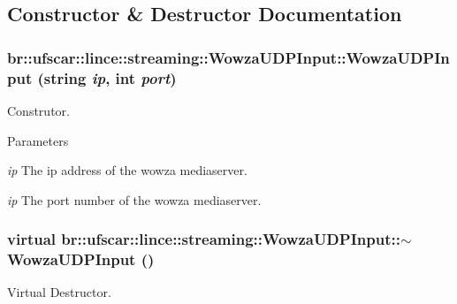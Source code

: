 \subsection{Constructor \& Destructor Documentation}
\hypertarget{classbr_1_1ufscar_1_1lince_1_1streaming_1_1WowzaUDPInput_a3cd953cb0be364b786b15745e69f6bd6}{
\subsubsection[{WowzaUDPInput}]{\setlength{\rightskip}{0pt plus 5cm}br::ufscar::lince::streaming::WowzaUDPInput::WowzaUDPInput (string {\em ip}, \/  int {\em port})}}
\label{classbr_1_1ufscar_1_1lince_1_1streaming_1_1WowzaUDPInput_a3cd953cb0be364b786b15745e69f6bd6}


Construtor. 


\begin{DoxyParams}{Parameters}
\item[{\em ip}]The ip address of the wowza mediaserver. \item[{\em ip}]The port number of the wowza mediaserver. \end{DoxyParams}
\hypertarget{classbr_1_1ufscar_1_1lince_1_1streaming_1_1WowzaUDPInput_aa8aa52ebcc298f8e7e60df193cc0fefc}{
\subsubsection[{$\sim$WowzaUDPInput}]{\setlength{\rightskip}{0pt plus 5cm}virtual br::ufscar::lince::streaming::WowzaUDPInput::$\sim$WowzaUDPInput ()}}
\label{classbr_1_1ufscar_1_1lince_1_1streaming_1_1WowzaUDPInput_aa8aa52ebcc298f8e7e60df193cc0fefc}


Virtual Destructor. 



